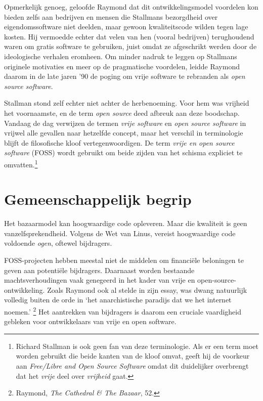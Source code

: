 \documentclass[
  a5paper,
  smalldemyvopaper,11pt,twoside,onecolumn,openright,extrafontsizes,
hidelinks]{memoir}
\begin{document}
Opmerkelijk genoeg, geloofde Raymond dat dit ontwikkelingsmodel
voordelen kon bieden zelfs aan bedrijven en mensen die Stallmans
bezorgdheid over eigendomssoftware niet deelden, maar gewoon
kwaliteitscode wilden tegen lage kosten. Hij vermoedde echter dat velen
van hen (vooral bedrijven) terughoudend waren om gratis software te
gebruiken, juist omdat ze afgeschrikt werden door de ideologische
verhalen eromheen. Om minder nadruk te leggen op Stallmans originele
motivaties en meer op de pragmatische voordelen, leidde Raymond daarom
in de late jaren '90 de poging om vrije software te rebranden als
\emph{open source software}.

Stallman stond zelf echter niet achter de herbenoeming. Voor hem was
vrijheid het voornaamste, en de term \emph{open source} deed afbreuk aan
deze boodschap. Vandaag de dag verwijzen de termen \emph{vrije software}
en \emph{open source software} in vrijwel alle gevallen naar hetzelfde
concept, maar het verschil in terminologie blijft de filosofische kloof
vertegenwoordigen. De term \emph{vrije en open source software} (FOSS)
wordt gebruikt om beide zijden van het schisma expliciet te
omvatten.\footnote{Richard Stallman is ook geen fan van deze
  terminologie. Als er een term moet worden gebruikt die beide kanten
  van de kloof omvat, geeft hij de voorkeur aan \emph{Free/Libre and
  Open Source Software} omdat dit duidelijker overbrengt dat het
  \emph{vrije} deel over \emph{vrijheid} gaat.}

\section{Gemeenschappelijk begrip}\label{gemeenschappelijk-begrip}

Het bazaarmodel kan hoogwaardige code opleveren. Maar die kwaliteit is
geen vanzelfsprekendheid. Volgens de Wet van Linus, vereist hoogwaardige
code voldoende \emph{ogen}, oftewel bijdragers.

FOSS-projecten hebben meestal niet de middelen om financiële beloningen
te geven aan potentiële bijdragers. Daarnaast worden bestaande
machtsverhoudingen vaak genegeerd in het kader van vrije en
open-source-ontwikkeling. Zoals Raymond ook al stelde in zijn essay, was
dwang natuurlijk volledig buiten de orde in `het anarchistische paradijs
dat we het internet noemen.' \footnote{\hspace{0pt}Raymond, \emph{The
  Cathedral \& The Bazaar}, 52.} Het aantrekken van bijdragers is daarom
een cruciale vaardigheid gebleken voor ontwikkelaars van vrije en open
software.
\end{document}
